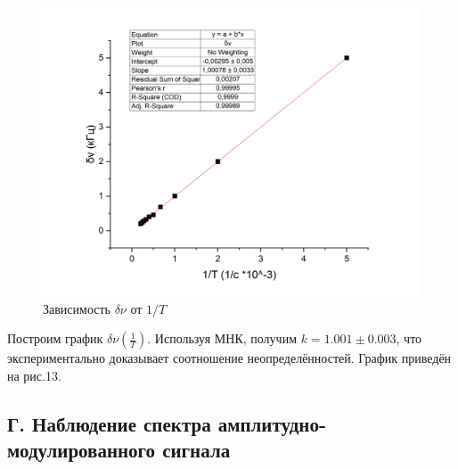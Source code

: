 \documentclass[a4paper,12pt]{article}
\theoremstyle{definition}
\begin{document}
\begin{enumerate}
\newpage

\begin{figure}[h]
    \centering
    \includegraphics[width=0.7\linewidth]{grafic2.png}
    \caption{Зависимость $\delta \nu$ от $1/T$}
    \label{grafic2}
\end{figure}
Построим график $\delta\nu\left(\frac{1}{T}\right)$. Используя МНК, получим $k=1.001\pm0.003$, что экспериментально доказывает соотношение неопределённостей. График приведён на рис.13.
\end{enumerate}


\newpage

\subsection*{Г. Наблюдение спектра амплитудно-модулированного сигнала}
\end{document}
